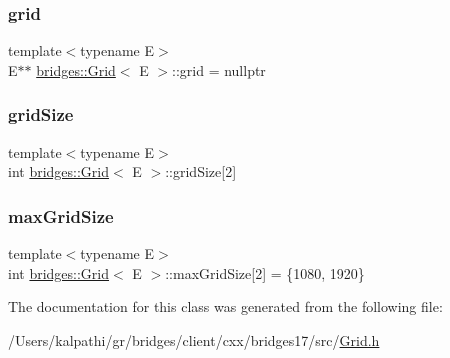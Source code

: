\subsubsection{\texorpdfstring{grid}{grid}}
{\footnotesize\ttfamily template$<$typename E$>$ \\
E$\ast$$\ast$ \mbox{\hyperlink{classbridges_1_1_grid}{bridges\+::\+Grid}}$<$ E $>$\+::grid = nullptr\hspace{0.3cm}{\ttfamily [protected]}}

\mbox{\label{classbridges_1_1_grid_af7c3a077b54e3346621e54276c1fa13e}} 
\subsubsection{\texorpdfstring{grid\+Size}{gridSize}}
{\footnotesize\ttfamily template$<$typename E$>$ \\
int \mbox{\hyperlink{classbridges_1_1_grid}{bridges\+::\+Grid}}$<$ E $>$\+::grid\+Size\mbox{[}2\mbox{]}\hspace{0.3cm}{\ttfamily [protected]}}

\mbox{\label{classbridges_1_1_grid_a800909a94e0affac82da79cf3e6d03e5}} 
\subsubsection{\texorpdfstring{max\+Grid\+Size}{maxGridSize}}
{\footnotesize\ttfamily template$<$typename E$>$ \\
int \mbox{\hyperlink{classbridges_1_1_grid}{bridges\+::\+Grid}}$<$ E $>$\+::max\+Grid\+Size\mbox{[}2\mbox{]} = \{1080, 1920\}\hspace{0.3cm}{\ttfamily [protected]}}



The documentation for this class was generated from the following file\+:\begin{DoxyCompactItemize}
\item 
/\+Users/kalpathi/gr/bridges/client/cxx/bridges17/src/\mbox{\hyperlink{_grid_8h}{Grid.\+h}}\end{DoxyCompactItemize}
